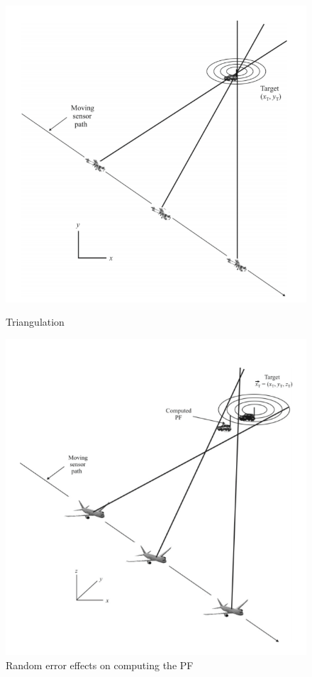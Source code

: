 \documentclass[english,purist]{ist-report}
\begin{document}
\begin{figure}[ht]
    \begin{minipage}[b]{0.49\textwidth}
        \captionsetup{width = 0.9\linewidth}
        \centering
        \includegraphics[width=0.9\linewidth]{target5.png}
        \caption{Triangulation}
        \label{target5}
    \end{minipage}
    \begin{minipage}[b]{0.49\textwidth}
        \captionsetup{width = 0.9\linewidth}
        \centering
        \includegraphics[width=0.9\linewidth]{target6.png}
        \caption{Random error effects on computing the PF}
        \label{target6}
    \end{minipage}
\end{figure}
\end{document}
